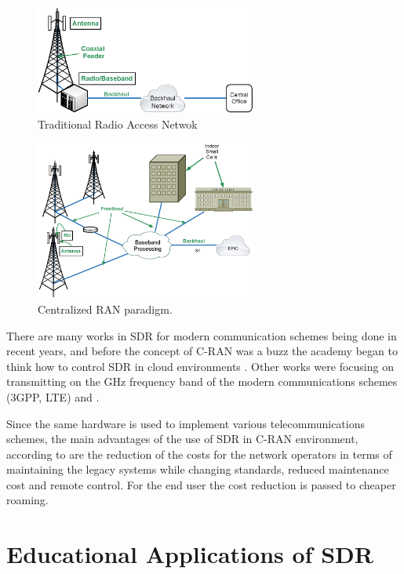 \begin{figure}[htbp]
    \centering
    \includegraphics[width=0.65\textwidth]{./figures/traditional_bs}
    \caption{ Traditional Radio Access Netwok
    \label{fig:tran}}
\end{figure}

\begin{figure}[htbp]
    \centering
    \includegraphics[width=0.65\textwidth]{./figures/c_RAN}
    \caption{ Centralized RAN paradigm.
    \label{fig:cran}}
\end{figure}

There are many works in SDR for modern communication schemes being done in
recent years, and before the concept of C-RAN was a buzz the academy began to
think how to control SDR in cloud environments \cite{dayananda2012}. Other
works were focusing on transmitting on the GHz frequency band of the modern
communications schemes (3GPP, LTE) \cite{kelley2009} and \cite{neenu2014}.

Since the same hardware is used to implement various telecommunications schemes,
the main advantages of the use of SDR in C-RAN environment, according to
\cite{dayananda2012} are the reduction of the costs for the network operators in
terms of maintaining the legacy systems while changing standards, reduced
maintenance cost and remote control. For the end user the cost reduction is
passed to cheaper roaming.

\section{Educational Applications of SDR}

